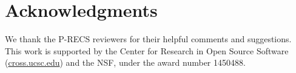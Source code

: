 \documentclass[sigconf]{acmart}
\begin{document}






\section*{Acknowledgments}

We thank the P-RECS reviewers for their helpful comments and suggestions.  This
work is supported by the Center for Research in Open Source Software
(\href{https://cross.soe.ucsc.edu}{cross.ucsc.edu}) and the NSF, under the
award number 1450488.



\end{document}

